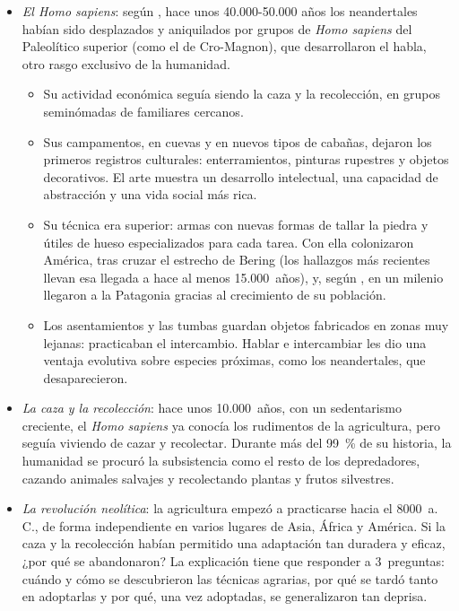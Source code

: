 \documentclass[11pt]{article}
\begin{document}
\begin{itemize}
\begin{itemize}
  \item Hace unos 200.000~años se impuso en Europa el neandertal, con rasgos biológicos ya muy próximos a los humanos modernos.
  \end{itemize}
\item \emph{El \emph{Homo sapiens}}: según , hace unos 40.000-50.000 años los neandertales habían sido desplazados y aniquilados por grupos de \emph{Homo sapiens} del Paleolítico superior (como el de Cro-Magnon), que desarrollaron el habla, otro rasgo exclusivo de la humanidad.
  \begin{itemize}
  \item Su actividad económica seguía siendo la caza y la recolección, en grupos seminómadas de familiares cercanos.
  \item Sus campamentos, en cuevas y en nuevos tipos de cabañas, dejaron los primeros registros culturales: enterramientos, pinturas rupestres y objetos decorativos. El arte muestra un desarrollo intelectual, una capacidad de abstracción y una vida social más rica.
  \item Su técnica era superior: armas con nuevas formas de tallar la piedra y útiles de hueso especializados para cada tarea. Con ella colonizaron América, tras cruzar el estrecho de Bering (los hallazgos más recientes llevan esa llegada a hace al menos 15.000~años), y, según , en un milenio llegaron a la Patagonia gracias al crecimiento de su población.
  \item Los asentamientos y las tumbas guardan objetos fabricados en zonas muy lejanas: practicaban el intercambio. Hablar e intercambiar les dio una ventaja evolutiva sobre especies próximas, como los neandertales, que desaparecieron.
  \end{itemize}
\item \emph{La caza y la recolección}: hace unos 10.000~años, con un sedentarismo creciente, el \emph{Homo sapiens} ya conocía los rudimentos de la agricultura, pero seguía viviendo de cazar y recolectar. Durante más del 99~\% de su historia, la humanidad se procuró la subsistencia como el resto de los depredadores, cazando animales salvajes y recolectando plantas y frutos silvestres.
\item \emph{La revolución neolítica}: la agricultura empezó a practicarse hacia el 8000~a.\,C., de forma independiente en varios lugares de Asia, África y América. Si la caza y la recolección habían permitido una adaptación tan duradera y eficaz, ¿por qué se abandonaron? La explicación tiene que responder a 3~preguntas: cuándo y cómo se descubrieron las técnicas agrarias, por qué se tardó tanto en adoptarlas y por qué, una vez adoptadas, se generalizaron tan deprisa.

\end{itemize}
\end{document}
